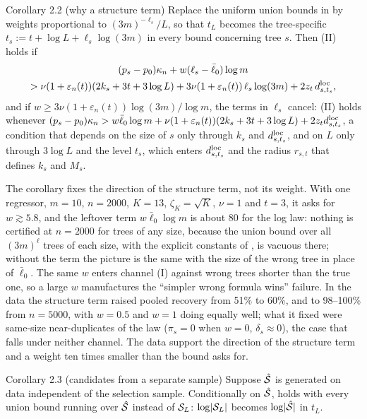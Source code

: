 \begin{result}[Corollary2.2]{Corollary 2.2 (why a structure term)}
Replace the uniform union bounds in  by weights proportional to $(3m)^{-\ell_s}/L$, so that $t_L$ becomes the tree-specific $t_s := t + \log L + \ell_s\log(3m)$ in every bound concerning tree $s$. Then (II) holds if
\begin{multline*}
(p_s - p_0)\kappa_n + w(\ell_s - \bar\ell_0)\log m \\ > \nu(1 + \varepsilon_n(t))(2k_s + 3t + 3\log L) + 3\nu(1 + \varepsilon_n(t))\,\ell_s\log(3m) + 2z_t\,d^{\mathrm{loc}}_{s,t_s},
\end{multline*}
and if $w \ge 3\nu(1 + \varepsilon_n(t))\log(3m)/\log m$, the terms in $\ell_s$ cancel: (II) holds whenever $(p_s - p_0)\kappa_n > w\bar\ell_0\log m + \nu(1 + \varepsilon_n(t))(2k_s + 3t + 3\log L) + 2z_td^{\mathrm{loc}}_{s,t_s}$, a condition that depends on the size of $s$ only through $k_s$ and $d^{\mathrm{loc}}_{s,t_s}$, and on $L$ only through $3\log L$ and the level $t_s$, which enters $d^{\mathrm{loc}}_{s,t_s}$ and the radius $r_{s,t}$ that defines $k_s$ and $M_s$.
\end{result}

The corollary fixes the direction of the structure term, not its weight. With one regressor, $m = 10$, $n = 2000$, $K = 13$, $\zeta_K = \sqrt K$, $\nu = 1$ and $t = 3$, it asks for $w \gtrsim 5.8$, and the leftover term $w\bar\ell_0\log m$ is about $80$ for the log law: nothing is certified at $n = 2000$ for trees of any size, because the union bound over all $(3m)^{\ell}$ trees of each size, with the explicit constants of , is vacuous there; without the term the picture is the same with the size of the wrong tree in place of $\bar\ell_0$. The same $w$ enters channel (I) against wrong trees shorter than the true one, so a large $w$ manufactures the ``simpler wrong formula wins'' failure. In the data the structure term raised pooled recovery from 51\% to 60\%, and to 98--100\% from $n = 5000$, with $w = 0.5$ and $w = 1$ doing equally well; what it fixed were same-size near-duplicates of the law ($\pi_s = 0$ when $w = 0$, $\delta_s \approx 0$), the case that falls under neither channel. The data support the direction of the structure term and a weight ten times smaller than the bound asks for.

\begin{result}[Corollary2.3]{Corollary 2.3 (candidates from a separate sample)}
Suppose $\hat{\mathcal{S}}$ is generated on data independent of the selection sample. Conditionally on $\hat{\mathcal{S}}$,  holds with every union bound running over $\hat{\mathcal{S}}$ instead of $\mathcal{S}_L$: $\log\lvert \mathcal{S}_L\rvert$ becomes $\log\lvert \hat{\mathcal{S}}\rvert$ in $t_L$.
\end{result}

